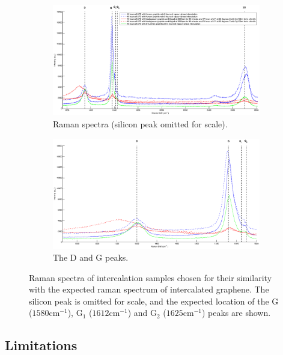 \documentclass[12pt,titlepage]{article}
\begin{document}
	\begin{figure}
		\centering
		\begin{subfigure}{1\textwidth}
			\centering
			\includegraphics[width=\textwidth]{figures/intercalated.eps}
			\caption{Raman spectra (silicon peak omitted for scale).}
			\label{fig:intercalated-all}
		\end{subfigure}
		\begin{subfigure}{1\textwidth}
			\centering
			\includegraphics[width=\textwidth]{figures/intercalated-DG.eps}
			\caption{The D and G peaks.}
			\label{fig:intercalated-DG}
		\end{subfigure}
		\caption[Raman spectra of intercalation samples.]{Raman spectra of intercalation samples chosen for their similarity with the expected raman spectrum of intercalated graphene. The silicon peak is omitted for scale, and the expected location of the G ($1580\text{cm}^{-1}$), G$_1$ ($1612\text{cm}^{-1}$) and G$_2$ ($1625\text{cm}^{-1}$) peaks are shown.}
		\label{fig:intercalated}
	\end{figure}
	
	\subsection{Limitations}
	
\end{document}
